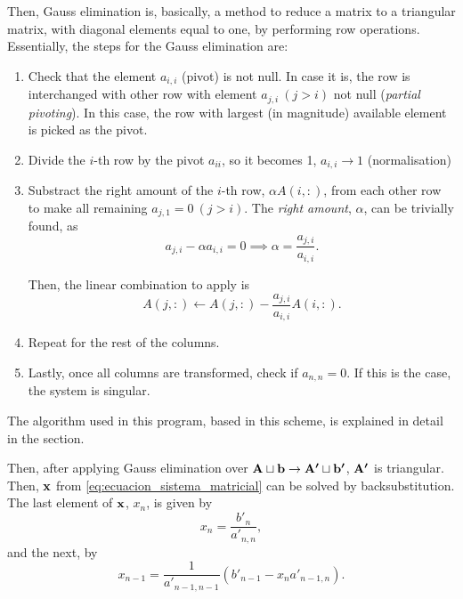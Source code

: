 Then, Gauss elimination is, basically, a method to reduce a matrix to a triangular
matrix, with diagonal elements equal to one, by performing row operations.
Essentially, the steps for the Gauss elimination are:
\begin{enumerate}
    \item Check that the element $a_{i,i}$ (pivot) is not null. In case it is, the row is
        interchanged with other row with element $a_{j,i}\ \left( j > i \right)$ 
        not null (\textit{partial pivoting}).
        In this case, the row with largest (in magnitude) available element
        is picked as the pivot.
    \item Divide the $i$-th row by the pivot $a_{ii}$, so it becomes 1, $a_{i,i} \to 1$ (normalisation)
    \item Substract the right amount of the $i$-th row, $\alpha A\left( i, : \right)$,
        from each other row to make all remaining $a_{j,1} = 0\ \left( j > i \right)$.
        The \textit{right amount}, $\alpha$, can be trivially found, as 
        \begin{equation}
            a_{j,i} - \alpha a_{i,i} = 0
            \implies
            \alpha = \frac{ a_{j,i} }{a_{i,i}}.
        \end{equation}
        
        Then, the linear combination to apply is 
        \begin{equation}
            A\left( j,: \right) \leftarrow A\left( j,: \right) - \frac{ a_{j,i} }{a_{i,i}} A\left( i,: \right).
        \end{equation}
    \item Repeat for the rest of the columns.
    \item Lastly, once all columns are transformed, check if $a_{n,n} = 0$. 
        If this is the case, the system is singular.
\end{enumerate}

The algorithm used in this program, based in this scheme, is explained in detail
in the  section.

Then, after applying Gauss elimination over $\boldsymbol{\mathrm{A}} \sqcup \boldsymbol{\mathrm{b}} \to \boldsymbol{\mathrm{A'}} \sqcup \boldsymbol{\mathrm{b'}}$, $\boldsymbol{\mathrm{A'}}$ 
is triangular. Then, $\boldsymbol{\mathrm{x}}$ from \cref{eq:ecuacion_sistema_matricial} can be solved by
backsubstitution. The last element of $\boldsymbol{\mathrm{x}}$, $x_{n}$, is given by 
\begin{equation}
    x_{n} = \frac{ b'_n }{a'_{n,n}},
\end{equation}
and the next, by 
\begin{equation}
    x_{n - 1} = \frac{1}{a'_{n-1, n-1}} \left( b'_{n - 1} - x_{n} a'_{n-1,n} \right).
\end{equation}

